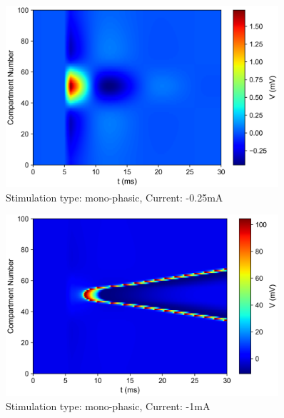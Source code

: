 \documentclass{scrartcl}
\begin{document}
\newpage
\begin{figure}[h]
	\centering
	\includegraphics[width=0.9\textwidth]{figures/potential_SimulationType.mono_amp-0.00025.png}
	\caption{Stimulation type: mono-phasic, Current: -0.25mA}
	\label{fig:sim1}
\end{figure}
\begin{figure}[h!]
	\centering
	\includegraphics[width=0.9\textwidth]{figures/potential_SimulationType.mono_amp-0.001.png}
	\caption{Stimulation type: mono-phasic, Current: -1mA}
	\label{fig:sim2}
\end{figure}
\end{document}
